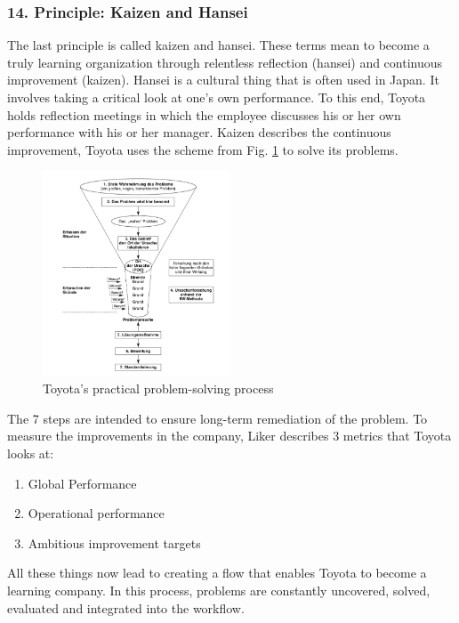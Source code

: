 \documentclass[a4paper,12pt]{scrartcl}
\begin{document}
\subsubsection{14. Principle: Kaizen and Hansei}

The last principle is called kaizen and hansei. These terms mean to become a truly learning organization through relentless reflection (hansei) and continuous improvement (kaizen). Hansei is a cultural thing that is often used in Japan. It involves taking a critical look at one's own performance. To this end, Toyota holds reflection meetings in which the employee discusses his or her own performance with his or her manager. Kaizen describes the continuous improvement, Toyota uses the scheme from Fig. \ref{Problem} to solve its problems. 

\clearpage

\begin{figure}[h] 
  \centering
     \includegraphics[width=0.5\textwidth]{Problem.png}
  \caption{Toyota's practical problem-solving process}
  \label{Problem}
\end{figure}

The 7 steps are intended to ensure long-term remediation of the problem. To measure the improvements in the company, Liker describes 3 metrics that Toyota looks at:

\begin{enumerate}
    \item Global Performance
    \item Operational performance
    \item Ambitious improvement targets
\end{enumerate}

All these things now lead to creating a flow that enables Toyota to become a learning company. In this process, problems are constantly uncovered, solved, evaluated and integrated into the workflow.
\end{document}
